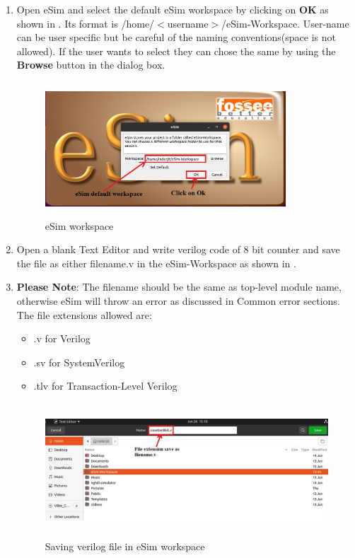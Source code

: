 \begin{enumerate}

\item Open eSim and select the default eSim workspace by clicking on \textbf{OK} as shown in . Its format is /home/$<$username$>$/eSim-Workspace. User-name can be user specific but be careful of the naming conventions(space is not allowed). If the user wants to select they can chose the same by using the \textbf{Browse} button in the dialog box.

\begin{figure}[H]
\centering
\includegraphics[width = 9cm, height = 5cm]{./NgVeri/defaultworkspace.png}
\caption{eSim workspace}
\label{workspaceeSim}
\end{figure}

\item Open a blank Text Editor and write verilog code of 8 bit counter and save the file as either filename.v in the eSim-Workspace as shown in . 
\item \textbf{Please Note}: The filename should be the same as top-level module name, otherwise eSim will throw an error as discussed in Common error sections.\\
The file extensions allowed are:
\begin{itemize}
    \item .v for Verilog 
    \item .sv for SystemVerilog
    \item .tlv for Transaction-Level Verilog
\end{itemize}

\begin{figure}[H]
\centering
\includegraphics[width = 14cm, height = 5cm]{./NgVeri/savingvfile.png}
\caption{Saving verilog file in eSim workspace}
\label{savingv}
\end{figure}


\end{enumerate}
